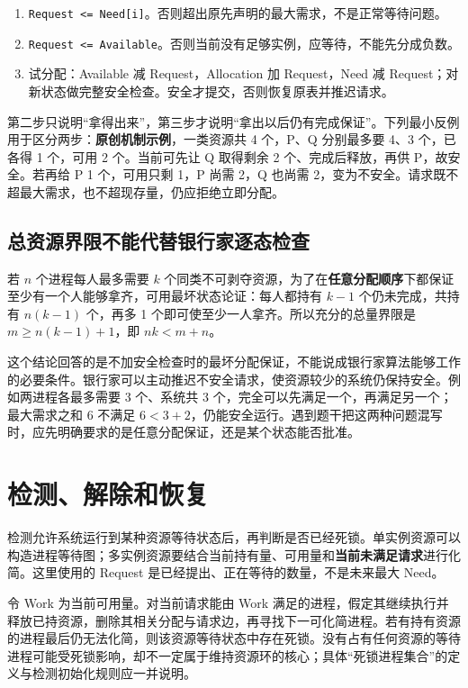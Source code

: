 \begin{enumerate}
\def\labelenumi{\arabic{enumi}.}
\tightlist
\item
  \allowbreak{}\texttt{Request\ \textless{}=\ Need{[}i{]}}。否则超出原先声明的最大需求，不是正常等待问题。
\item
  \allowbreak{}\texttt{Request\ \textless{}=\ Available}。否则当前没有足够实例，应等待，不能先分成负数。
\item
  试分配：Available 减 Request，Allocation 加 Request，Need 减 Request；对新状态做完整安全检查。安全才提交，否则恢复原表并推迟请求。
\end{enumerate}

第二步只说明``拿得出来''，第三步才说明``拿出以后仍有完成保证''。下列最小反例用于区分两步：\textbf{原创机制示例}，一类资源共 4 个，P、Q 分别最多要 4、3 个，已各得 1 个，可用 2 个。当前可先让 Q 取得剩余 2 个、完成后释放，再供 P，故安全。若再给 P 1 个，可用只剩 1，P 尚需 2，Q 也尚需 2，变为不安全。请求既不超最大需求，也不超现存量，仍应拒绝立即分配。

\subsection{总资源界限不能代替银行家逐态检查}\label{os-c04-h147}

若 \(n\) 个进程每人最多需要 \(k\) 个同类不可剥夺资源，为了在\textbf{任意分配顺序}下都保证至少有一个人能够拿齐，可用最坏状态论证：每人都持有 \(k-1\) 个仍未完成，共持有 \(n(k-1)\) 个，再多 1 个即可使至少一人拿齐。所以充分的总量界限是 \(m\ge n(k-1)+1\)，即 \(nk<m+n\)。

这个结论回答的是不加安全检查时的最坏分配保证，不能说成银行家算法能够工作的必要条件。银行家可以主动推迟不安全请求，使资源较少的系统仍保持安全。例如两进程各最多需要 3 个、系统共 3 个，完全可以先满足一个，再满足另一个；最大需求之和 6 不满足 \(6<3+2\)，仍能安全运行。遇到题干把这两种问题混写时，应先明确要求的是任意分配保证，还是某个状态能否批准。

\section{检测、解除和恢复}\label{os-4-4}

检测允许系统运行到某种资源等待状态后，再判断是否已经死锁。单实例资源可以构造进程等待图；多实例资源要结合当前持有量、可用量和\textbf{当前未满足请求}进行化简。这里使用的 Request 是已经提出、正在等待的数量，不是未来最大 Need。

令 Work 为当前可用量。对当前请求能由 Work 满足的进程，假定其继续执行并释放已持资源，删除其相关分配与请求边，再寻找下一可化简进程。若有持有资源的进程最后仍无法化简，则该资源等待状态中存在死锁。没有占有任何资源的等待进程可能受死锁影响，却不一定属于维持资源环的核心；具体``死锁进程集合''的定义与检测初始化规则应一并说明。

